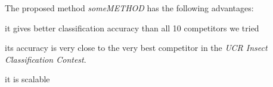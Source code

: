 The proposed method {\em someMETHOD}
has the following advantages:
\bit
\item it gives better classification accuracy than all 10 competitors we tried
\item its accuracy is very close to the very best competitor
      in the {\em UCR Insect Classification Contest}.
\item it is scalable
\eit
